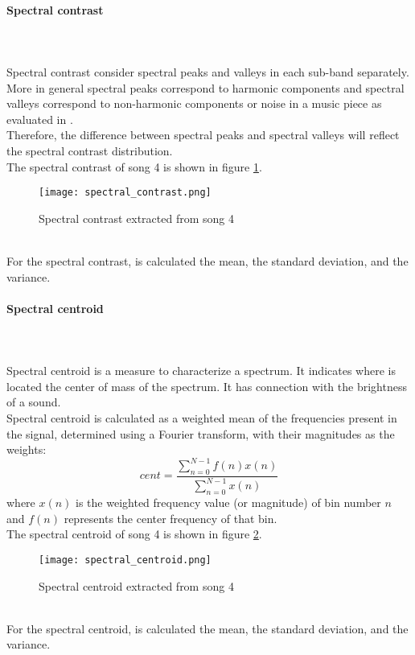 \paragraph{Spectral contrast}
\mbox{} \\ \\
Spectral contrast consider spectral peaks and valleys in each sub-band separately. More in general spectral peaks correspond to harmonic components and spectral valleys correspond to non-harmonic components or noise in a music piece as evaluated in \cite{jiang2002music}.
\\
Therefore, the difference between spectral peaks and spectral valleys will reflect the spectral contrast distribution.
\\
The spectral contrast of song 4 is shown in figure \ref{fig:spectral_contrast}.
\begin{figure}[h]
    \centering
    \texttt{[image: spectral\_contrast.png]} 
	\caption{Spectral contrast extracted from song 4}
    \label{fig:spectral_contrast}
\end{figure}
\\
For the spectral contrast, is calculated the mean, the standard deviation, and the variance.

\paragraph{Spectral centroid}
\mbox{} \\ \\
Spectral centroid is a measure to characterize a spectrum. It indicates where is located the center of mass of the spectrum. It has connection with the brightness of a sound.
\\
Spectral centroid is calculated as a weighted mean of the frequencies present in the signal, determined using a Fourier transform, with their magnitudes as the weights:
\begin{equation}
	cent=\dfrac{\sum_{n=0}^{N-1}{f(n)x(n)}}{\sum_{n=0}^{N-1}{x(n)}}
\end{equation}
where $x(n)$ is the weighted frequency value (or magnitude) of bin number $n$ and $f(n)$ represents the center frequency of that bin.
\\
The spectral centroid of song 4 is shown in figure \ref{fig:spectral_centroid}.
\begin{figure}[h]
    \centering
    \texttt{[image: spectral\_centroid.png]} 
	\caption{Spectral centroid extracted from song 4}
    \label{fig:spectral_centroid}
\end{figure}
\\
For the spectral centroid, is calculated the mean, the standard deviation, and the variance.

